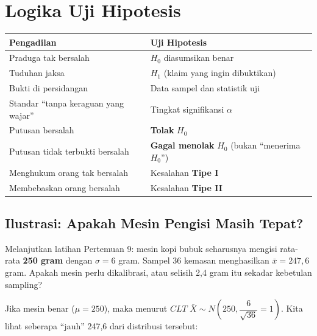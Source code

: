 \documentclass[
  indonesian,
  letterpaper,
]{book}
\newcounter{none} %
\begin{document}
\section{Logika Uji Hipotesis}\label{logika-uji-hipotesis}

{\def\LTcaptype{none} %
\begin{longtable}[]{@{}
  >{\raggedright\arraybackslash}p{}
  >{\raggedright\arraybackslash}p{}@{}}
\toprule\noalign{}
\begin{minipage}[b]{\linewidth}\raggedright
Pengadilan
\end{minipage} & \begin{minipage}[b]{\linewidth}\raggedright
Uji Hipotesis
\end{minipage} \\
\midrule\noalign{}
\endhead
\bottomrule\noalign{}
\endlastfoot
Praduga tak bersalah & \(H_0\) diasumsikan benar \\
Tuduhan jaksa & \(H_1\) (klaim yang ingin dibuktikan) \\
Bukti di persidangan & Data sampel dan statistik uji \\
Standar ``tanpa keraguan yang wajar'' & Tingkat signifikansi
\(\alpha\) \\
Putusan bersalah & \textbf{Tolak} \(H_0\) \\
Putusan tidak terbukti bersalah & \textbf{Gagal menolak} \(H_0\) (bukan
``menerima \(H_0\)'') \\
Menghukum orang tak bersalah & Kesalahan \textbf{Tipe I} \\
Membebaskan orang bersalah & Kesalahan \textbf{Tipe II} \\
\end{longtable}
}

\subsection{Ilustrasi: Apakah Mesin Pengisi Masih
Tepat?}\label{ilustrasi-apakah-mesin-pengisi-masih-tepat}

Melanjutkan latihan Pertemuan 9: mesin kopi bubuk seharusnya mengisi
rata-rata \textbf{250 gram} dengan \(\sigma = 6\) gram. Sampel 36
kemasan menghasilkan \(\bar{x} = 247{,}6\) gram. Apakah mesin perlu
dikalibrasi, atau selisih 2,4 gram itu sekadar kebetulan sampling?

Jika mesin benar (\(\mu = 250\)), maka menurut \(CLT\)
\(\bar{X} \sim N\left(250, \dfrac{6}{\sqrt{36}} = 1\right)\). Kita lihat
seberapa ``jauh'' 247,6 dari distribusi tersebut:
\end{document}
